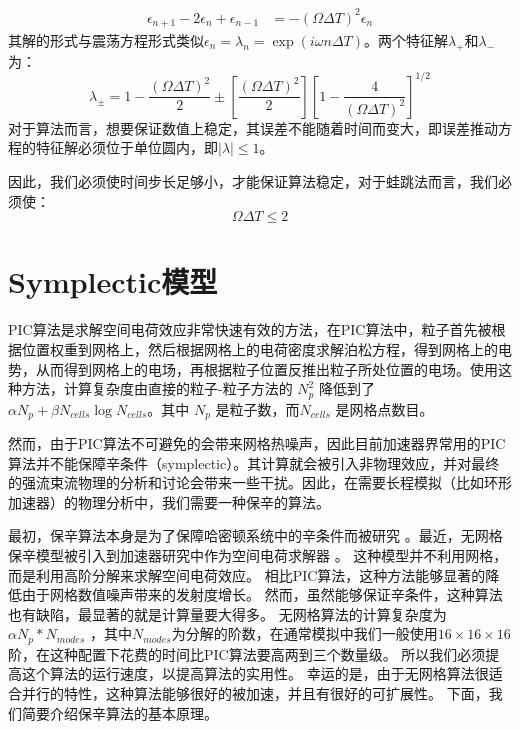 {\begin{align}
         {\epsilon}_{n+1}-2{\epsilon}_n+{\epsilon}_{n-1} &= -(\Omega \Delta T)^2 {\epsilon}_n
         \label{eq:leapfrog_stabilit12}
      \end{align}
其解的形式与震荡方程形式类似${\epsilon}_n = {\lambda}_n = \exp(i\omega n \Delta T)$。两个特征解${\lambda}_+$和${\lambda}_-$为：
      \begin{equation}
         \label{eq:leapfrog_stabilit13}
         {\lambda}_\pm = 1- \frac{(\Omega \Delta T)^2}{2}\pm \left[\frac{(\Omega \Delta T)^2}{2}\right]\left[1-\frac{4}{(\Omega \Delta T)^2}\right]^{1/2}
      \end{equation}
对于算法而言，想要保证数值上稳定，其误差不能随着时间而变大，即误差推动方程的特征解必须位于单位圆内，即$|\lambda|\leq1$。

因此，我们必须使时间步长足够小，才能保证算法稳定，对于蛙跳法而言，我们必须使：
      \begin{equation}
          \Omega \Delta T \leq 2
      \end{equation}


\section{Symplectic模型}          \label{section:symplectic_theory}
PIC算法是求解空间电荷效应非常快速有效的方法，在PIC算法中，粒子首先被根据位置权重到网格上，然后根据网格上的电荷密度求解泊松方程，得到网格上的电势，从而得到网格上的电场，再根据粒子位置反推出粒子所处位置的电场。使用这种方法，计算复杂度由直接的粒子-粒子方法的 $N_p^2$ 降低到了$\alpha N_p + \beta N_{cells}\log{N_{cells}}$。其中 $N_p$ 是粒子数，而$N_{cells}$ 是网格点数目。

然而，由于PIC算法不可避免的会带来网格热噪声，因此目前加速器界常用的PIC算法并不能保障辛条件（symplectic）。其计算就会被引入非物理效应，并对最终的强流束流物理的分析和讨论会带来一些干扰。因此，在需要长程模拟（比如环形加速器）的物理分析中，我们需要一种保辛的算法。

最初，保辛算法本身是为了保障哈密顿系统中的辛条件而被研究 \cite{symplectic_channel1990, symplectic_yoshida1990}。最近，无网格保辛模型被引入到加速器研究中作为空间电荷求解器 \cite{symplectic_ji2017}。
这种模型并不利用网格，而是利用高阶分解来求解空间电荷效应。
相比PIC算法，这种方法能够显著的降低由于网格数值噪声带来的发射度增长。
然而，虽然能够保证辛条件，这种算法也有缺陷，最显著的就是计算量要大得多。
无网格算法的计算复杂度为 $\alpha N_p * N_{modes}$ ，其中$N_{modes}$为分解的阶数，在通常模拟中我们一般使用$16 \times 16 \times 16$ 阶，在这种配置下花费的时间比PIC算法要高两到三个数量级。
所以我们必须提高这个算法的运行速度，以提高算法的实用性。
幸运的是，由于无网格算法很适合并行的特性，这种算法能够很好的被加速，并且有很好的可扩展性。
下面，我们简要介绍保辛算法的基本原理。

}
